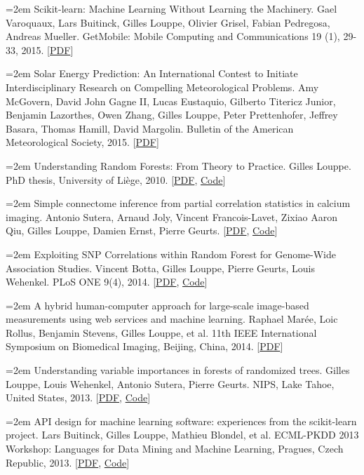 \documentclass{scrartcl}
\newcommand{\MarginText}[1]{\marginpar{\raggedleft\itshape\small#1}}
\newcommand{\NewPublication}[4]{\noindent\hangindent=2em\hangafter=0 \MarginText{\color{black} #1}{\footnotesize [{\color{Maroon}#2}]} #3 {\footnotesize\color{gray}#4}\vspace{0.5em}}
\begin{document}
\begin{cv}{}
\NewPublication{}{12}{Scikit-learn: Machine Learning Without Learning the Machinery.}{%
Gael Varoquaux, Lars Buitinck, Gilles Louppe, Olivier Grisel, Fabian Pedregosa, Andreas Mueller.
GetMobile: Mobile Computing and Communications 19 (1), 29-33, 2015.
[\href{https://dl.acm.org/citation.cfm?id=2786995}{PDF}]}

\NewPublication{}{11}{Solar Energy Prediction: An International Contest to Initiate Interdisciplinary Research on Compelling Meteorological Problems.}{%
Amy McGovern, David John Gagne II, Lucas Eustaquio, Gilberto Titericz Junior, Benjamin Lazorthes, Owen Zhang, Gilles Louppe, Peter Prettenhofer, Jeffrey Basara, Thomas Hamill, David Margolin.
Bulletin of the American Meteorological Society, 2015.
[\href{http://hdl.handle.net/2268/177115}{PDF}]}

\NewPublication{2014}{10}{Understanding Random Forests: From Theory to Practice.}{%
Gilles Louppe.
PhD thesis, University of Li{\`e}ge, 2010.
[\href{http://hdl.handle.net/2268/170309}{PDF}, \href{https://github.com/glouppe/phd-thesis}{Code}]}

\NewPublication{}{9}{Simple connectome inference from partial correlation statistics in calcium imaging.}{%
Antonio Sutera, Arnaud Joly, Vincent Francois-Lavet, Zixiao Aaron Qiu, Gilles Louppe, Damien Ernst, Pierre Geurts.
[\href{http://hdl.handle.net/2268/169767}{PDF}, \href{https://github.com/glouppe/kaggle-connectomics}{Code}]}

\NewPublication{}{8}{Exploiting SNP Correlations within Random Forest for Genome-Wide Association Studies.}{%
Vincent Botta, Gilles Louppe, Pierre Geurts, Louis Wehenkel.
PLoS ONE 9(4), 2014.
[\href{http://dx.plos.org/10.1371/journal.pone.0093379}{PDF}, \href{https://github.com/0asa/TTree-source}{Code}]}

\NewPublication{}{7}{A hybrid human-computer approach for large-scale image-based measurements using web services and machine learning.}{%
Raphael Mar{\'e}e, Loic Rollus, Benjamin Stevens, Gilles Louppe, et al.
11th IEEE International Symposium on Biomedical Imaging, Beijing, China, 2014.
[\href{http://hdl.handle.net/2268/162084}{PDF}]}

\NewPublication{2013}{6}{Understanding variable importances in forests of randomized trees.}{%
Gilles Louppe, Louis Wehenkel, Antonio Sutera, Pierre Geurts.
NIPS, Lake Tahoe, United States, 2013.
[\href{http://hdl.handle.net/2268/155642}{PDF}, \href{http://github.com/glouppe/paper-variable-importances}{Code}]}

\NewPublication{}{5}{API design for machine learning software: experiences from the scikit-learn project.}{%
Lars Buitinck, Gilles Louppe, Mathieu Blondel, et al.
ECML-PKDD 2013 Workshop: Languages for Data Mining and Machine Learning, Pragues, Czech Republic, 2013.
[\href{http://hdl.handle.net/2268/154357}{PDF}, \href{http://github.com/scikit-learn/scikit-learn}{Code}]}


\end{cv}
\end{document}
